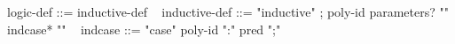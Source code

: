 \begin{syntax}
  logic-def ::= { inductive-def }
  \
  { inductive-def } ::= { "inductive" } ;
  { poly-id parameters? "{" indcase* "}" }
  \
  { indcase } ::= { "case" poly-id ":" pred ";" }
\end{syntax}
